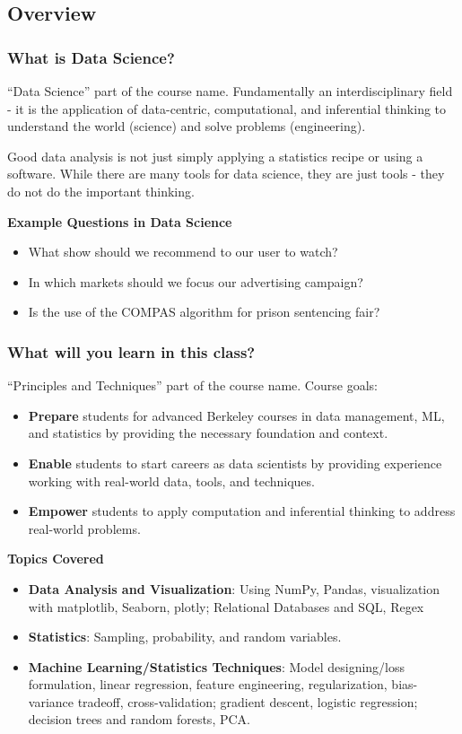 \subsection{Overview}
\subsubsection{What is Data Science?}
``Data Science'' part of the course name. Fundamentally an interdisciplinary field - it is the application of data-centric, computational, and inferential thinking to understand the world (science) and solve problems (engineering).

Good data analysis is not just simply applying a statistics recipe or using a software. While there are many tools for data science, they are just tools - they do not do the important thinking.

\textbf{Example Questions in Data Science}

\begin{itemize}
\item What show should we recommend to our user to watch?
\item In which markets should we focus our advertising campaign?
\item Is the use of the COMPAS algorithm for prison sentencing fair?
\end{itemize}

\subsubsection{What will you learn in this class?}
``Principles and Techniques'' part of the course name. Course goals:
\begin{itemize}
\item \textbf{Prepare} students for advanced Berkeley courses in data management, ML, and statistics by providing the necessary foundation and context.
\item \textbf{Enable} students to start careers as data scientists by providing experience working with real-world data, tools, and techniques.
\item \textbf{Empower} students to apply computation and inferential thinking to address real-world problems.
\end{itemize}

\textbf{Topics Covered}

\begin{itemize}
\item \textbf{Data Analysis and Visualization}: Using NumPy, Pandas, visualization with matplotlib, Seaborn, plotly; Relational Databases and SQL, Regex
\item \textbf{Statistics}: Sampling, probability, and random variables.
\item \textbf{Machine Learning/Statistics Techniques}: Model designing/loss formulation, linear regression, feature engineering, regularization, bias-variance tradeoff, cross-validation; gradient descent, logistic regression; decision trees and random forests, PCA.
\end{itemize}

